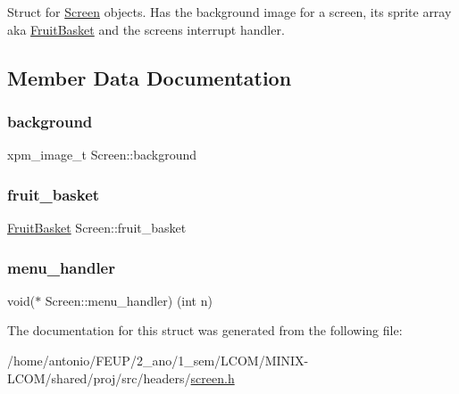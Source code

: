 Struct for \hyperlink{structScreen}{Screen} objects. Has the background image for a screen, it\textquotesingle{}s sprite array aka \hyperlink{structFruitBasket}{Fruit\+Basket} and the screen\textquotesingle{}s interrupt handler. 

\subsection{Member Data Documentation}
\mbox{\label{structScreen_a6bc9bc49ce6a6ff009a1e36ce2e7728e}} 
\subsubsection{\texorpdfstring{background}{background}}
{\footnotesize\ttfamily xpm\+\_\+image\+\_\+t Screen\+::background}

\mbox{\label{structScreen_ae8d2ff6f05989063701c35a1c7c9af04}} 
\subsubsection{\texorpdfstring{fruit\+\_\+basket}{fruit\_basket}}
{\footnotesize\ttfamily \hyperlink{structFruitBasket}{Fruit\+Basket} Screen\+::fruit\+\_\+basket}

\mbox{\label{structScreen_af566421bd2910a893dc1692c8a9357b0}} 
\subsubsection{\texorpdfstring{menu\+\_\+handler}{menu\_handler}}
{\footnotesize\ttfamily void($\ast$ Screen\+::menu\+\_\+handler) (int n)}



The documentation for this struct was generated from the following file\+:\begin{DoxyCompactItemize}
\item 
/home/antonio/\+F\+E\+U\+P/2\+\_\+ano/1\+\_\+sem/\+L\+C\+O\+M/\+M\+I\+N\+I\+X-\/\+L\+C\+O\+M/shared/proj/src/headers/\hyperlink{screen_8h}{screen.\+h}\end{DoxyCompactItemize}
